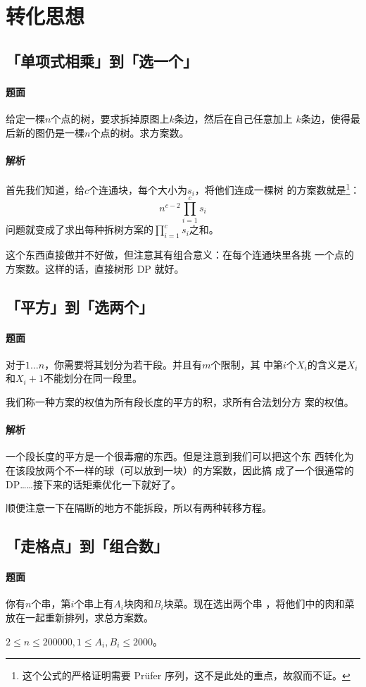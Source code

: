 \section{转化思想}
\subsection{「单项式相乘」到「选一个」}
\paragraph{题面}
给定一棵$n$个点的树，要求拆掉原图上$k$条边，然后在自己任意加上
$k$条边，使得最后新的图仍是一棵$n$个点的树。求方案数。
\paragraph{解析}
首先我们知道，给$c$个连通块，每个大小为$s_i$，将他们连成一棵树
的方案数就是\footnote{这个公式的严格证明需要 Pr\"ufer 序列，这不是此处的重点，故叙而不证。}：
\[n^{c-2}\prod_{i=1}^cs_i\]
问题就变成了求出每种拆树方案的$\prod_{i=1}^cs_i$之和。\par
这个东西直接做并不好做，但注意其有组合意义：在每个连通块里各挑
一个点的方案数。这样的话，直接树形 DP 就好。

\subsection{「平方」到「选两个」}
\paragraph{题面}
对于$1\ldots n$，你需要将其划分为若干段。并且有$m$个限制，其
中第$i$个$X_i$的含义是$X_i$和$X_i+1$不能划分在同一段里。\par
我们称一种方案的权值为所有段长度的平方的积，求所有合法划分方
案的权值。
\paragraph{解析}
一个段长度的平方是一个很毒瘤的东西。但是注意到我们可以把这个东
西转化为在该段放两个不一样的球（可以放到一块）的方案数，因此搞
成了一个很通常的DP……接下来的话矩乘优化一下就好了。\par
顺便注意一下在隔断的地方不能拆段，所以有两种转移方程。

\subsection{「走格点」到「组合数」}
\paragraph{题面}
你有$n$个串，第$i$个串上有$A_i$块肉和$B_i$块菜。现在选出两个串
，将他们中的肉和菜放在一起重新排列，求总方案数。\par
$2\leq n\leq 200000, 1\leq A_i,B_i\leq 2000$。
